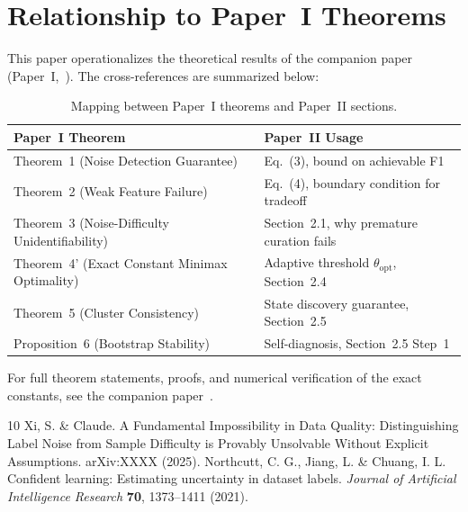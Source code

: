 \documentclass[11pt]{article}
\begin{document}
\section{Relationship to Paper~I Theorems}

This paper operationalizes the theoretical results of the companion paper (Paper~I,~\cite{xi2025fundamental}). The cross-references are summarized below:

\begin{table}[h]
\centering
\caption{Mapping between Paper~I theorems and Paper~II sections.}
\label{tab:crossref}
\begin{tabular}{ll}
\hline
Paper~I Theorem & Paper~II Usage \\
\hline
Theorem~1 (Noise Detection Guarantee) & Eq.~(3), bound on achievable F1 \\
Theorem~2 (Weak Feature Failure) & Eq.~(4), boundary condition for tradeoff \\
Theorem~3 (Noise-Difficulty Unidentifiability) & Section~2.1, why premature curation fails \\
Theorem~4' (Exact Constant Minimax Optimality) & Adaptive threshold $\theta_{\text{opt}}$, Section~2.4 \\
Theorem~5 (Cluster Consistency) & State discovery guarantee, Section~2.5 \\
Proposition~6 (Bootstrap Stability) & Self-diagnosis, Section~2.5 Step~1 \\
\hline
\end{tabular}
\end{table}

For full theorem statements, proofs, and numerical verification of the exact constants, see the companion paper~\cite{xi2025fundamental}.




\begin{thebibliography}{10}
 Xi, S. \& Claude. A Fundamental Impossibility in Data Quality: Distinguishing Label Noise from Sample Difficulty is Provably Unsolvable Without Explicit Assumptions. arXiv:XXXX (2025).
 Northcutt, C. G., Jiang, L. \& Chuang, I. L. Confident learning: Estimating uncertainty in dataset labels. \textit{Journal of Artificial Intelligence Research} \textbf{70}, 1373--1411 (2021).
\end{thebibliography}
\end{document}
